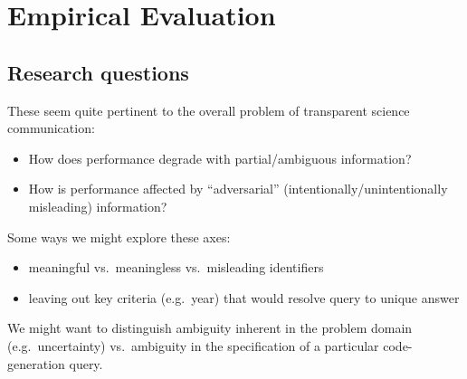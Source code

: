 \section{Empirical Evaluation}
\label{sec:evaluation}

\subsection{Research questions}

These seem quite pertinent to the overall problem of transparent science communication:
\begin{itemize}
\item How does performance degrade with partial/ambiguous information?
\item How is performance affected by ``adversarial'' (intentionally/unintentionally misleading) information?
\end{itemize}

Some ways we might explore these axes:
\begin{itemize}
\item meaningful vs.~meaningless vs.~misleading identifiers
\item leaving out key criteria (e.g.~year) that would resolve query to unique answer
\end{itemize}

We might want to distinguish ambiguity inherent in the problem domain (e.g.~uncertainty) vs.~ambiguity in the
specification of a particular code-generation query.
